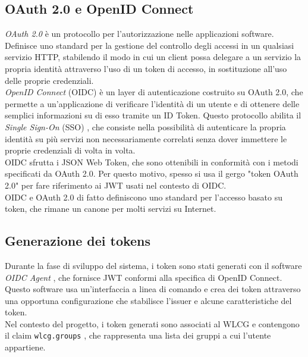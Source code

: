 \subsection{OAuth 2.0 e OpenID Connect}
\textit{OAuth 2.0} \cite{oauth_rfc} è un protocollo per l'autorizzazione nelle applicazioni software. Definisce uno standard per la gestione del controllo degli accessi
in un qualsiasi servizio HTTP, stabilendo il modo in cui un client possa delegare a un servizio la propria identità attraverso l'uso di un token di accesso, in sostituzione all'uso delle proprie credenziali. 
\\ \textit{OpenID Connect} (OIDC) \cite{oidc_doc} è un layer di autenticazione costruito su OAuth 2.0, che permette a un'applicazione di 
verificare l'identità di un utente e di ottenere delle semplici informazioni su di esso tramite un ID Token. Questo protocollo abilita il \textit{Single Sign-On} (SSO) \cite{sso_doc}, 
che consiste nella possibilità di autenticare la propria identità su più servizi non necessariamente correlati senza dover immettere le proprie credenziali di volta in volta. 
\\OIDC sfrutta i JSON Web Token, che sono ottenibili in conformità con i metodi specificati da OAuth 2.0. Per questo motivo, spesso si usa il gergo
"token OAuth 2.0" per fare riferimento ai JWT usati nel contesto di OIDC.  
\\OIDC e OAuth 2.0 di fatto definiscono uno standard per l'accesso basato su token, che rimane un canone per molti servizi su Internet.

\subsection{Generazione dei tokens}
Durante la fase di sviluppo del sistema, i token sono stati generati con il software \textit{OIDC Agent} \cite{oidc_agent}, che fornisce JWT conformi alla specifica di OpenID Connect.
Questo software usa un'interfaccia a linea di comando e crea dei token attraverso una opportuna configurazione che stabilisce l'issuer e alcune caratteristiche del token.
\\ Nel contesto del progetto, i token generati sono associati al WLCG e contengono il claim \texttt{wlcg.groups} \cite{wlcg_jwt}, che rappresenta una lista dei gruppi a cui l'utente appartiene. 


